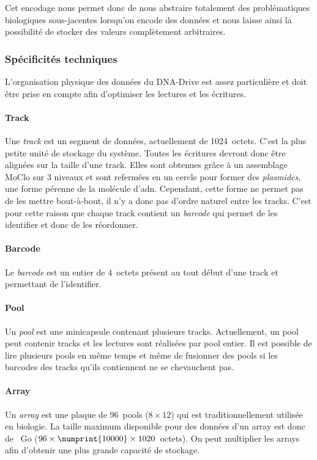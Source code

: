 \documentclass[a4paper]{report}
\begin{document}
Cet encodage nous permet donc de nous abstraire totalement des problématiques biologiques sous-jacentes lorsqu'on encode des données
et nous laisse ainsi la possibilité de stocker des valeurs complètement arbitraires.

\subsubsection{Spécificités techniques}

L'organisation physique des données du DNA-Drive est assez particulière et doit être prise en compte afin d'optimiser les lectures et les écritures.

\paragraph{Track} Une \emph{track} est un segment de données, actuellement de 1024~octets.
C'est la plus petite unité de stockage du système.
Toutes les écritures devront donc être alignées sur la taille d'une track.
Elles sont obtenues grâce à un assemblage MoClo \cite{werner2012fast} sur 3 niveaux
et sont refermées en un cercle pour former des \emph{plasmides}, une forme pérenne de la molécule d'\ac{adn}.
Cependant, cette forme ne permet pas de les mettre bout-à-bout,
il n'y a donc pas d'ordre naturel entre les tracks.
C'est pour cette raison que chaque track contient un \emph{barcode} qui permet de les identifier et donc de les réordonner.

\paragraph{Barcode} Le \emph{barcode} est un entier de 4~octets présent au tout début d'une track et permettant de l'identifier.

\paragraph{Pool} Un \emph{pool} est une minicapsule contenant plusieurs tracks.
Actuellement, un pool peut contenir  tracks et les lectures sont réalisées par pool entier.
Il est possible de lire plusieurs pools en même temps
et même de fusionner des pools si les barcodes des tracks qu'ils contiennent ne se chevauchent pas.

\paragraph{Array} Un \emph{array} est une plaque de 96~pools ($8\times12$) qui est traditionnellement utilisée en biologie.
La taille maximum disponible pour des données d’un array est donc de ~Go ($96\times\numprint{10000}\times1020$~octets).
On peut multiplier les arrays afin d'obtenir une plus grande capacité de stockage.
\end{document}
